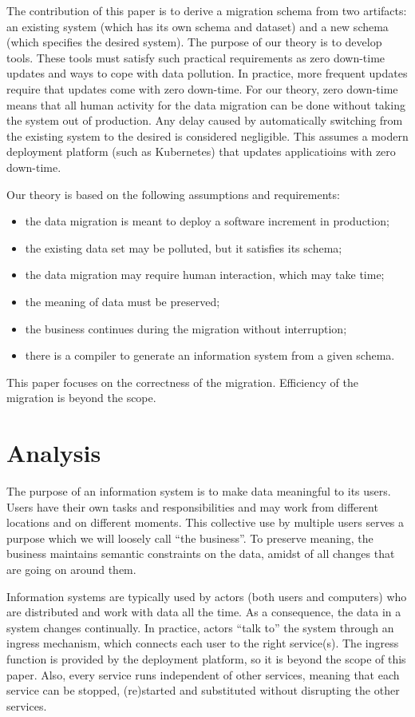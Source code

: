\documentclass{elsarticle}
\begin{document}
   The contribution of this paper is to derive a migration schema from two artifacts: an existing system
   (which has its own schema and dataset) and a new schema (which specifies the desired system).
   The purpose of our theory is to develop tools.
   These tools must satisfy such practical requirements as
   zero down-time updates and ways to cope with data pollution.
   In practice, more frequent updates require that updates come with zero down-time.
   For our theory, zero down-time means that all human activity for the data migration can be done without taking the system out of production.
   Any delay caused by automatically switching from the existing system to the desired is considered negligible.
   This assumes a modern deployment platform (such as Kubernetes) that updates applicatioins with zero down-time.
   
   Our theory is based on the following assumptions and requirements:
\begin{itemize}
   \item the data migration is meant to deploy a software increment in production;
   \item the existing data set may be polluted, but it satisfies its schema;
   \item the data migration may require human interaction, which may take time;
   \item the meaning of data must be preserved;
   \item the business continues during the migration without interruption;
   \item there is a compiler to generate an information system from a given schema.
\end{itemize}
   This paper focuses on the correctness of the migration.
   Efficiency of the migration is beyond the scope.

\section{Analysis}
   The purpose of an information system is to make data meaningful to its users.
   Users have their own tasks and responsibilities
   and may work from different locations and on different moments.
   This collective use by multiple users serves a purpose which we will loosely call ``the business''.
   To preserve meaning, the business maintains semantic constraints on the data,
   amidst of all changes that are going on around them.
   
   Information systems are typically used by actors (both users and computers) who are distributed and work with data all the time.
   As a consequence, the data in a system changes continually.
   In practice, actors ``talk to'' the system through an ingress mechanism, which connects each user to the right service(s).
   The ingress function is provided by the deployment platform, so it is beyond the scope of this paper.
   Also, every service runs independent of other services,
   meaning that each service can be stopped, (re)started and substituted without disrupting the other services.
\end{document}
